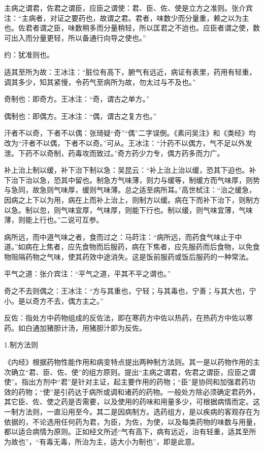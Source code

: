 \documentclass[draft,12pt]{ctexbook}
\begin{document}
\begin{jiaozhu}
  \item 主病之谓君，佐君之谓臣，应臣之谓使：君、臣、佐、使是立方之准则。张介宾注：“主病者，对证之要药也，故谓之君。君者，味数少而分量重，赖之以为主也。佐君者谓之臣，味数稍多而分量稍轻，所以匡君之不迨也。应臣者谓之使，数可出入而分量更轻，所以备通行向导之使也。”
  \item 约：犹准则也。
  \item 适其至所为故：王冰注：“脏位有高下，腑气有远近，病证有表里，药用有轻重，调其多少，知其紧慢，令药气至病所为故，勿太过与不及也。”
  \item 奇制也：即奇方。王冰注：“奇，谓古之单方。”
  \item 偶制也：即偶方。王冰注：“偶，谓古之复方也。”
  \item 汗者不以奇，下者不以偶：张琦疑“奇”“偶”二字误倒。《素问吴注》和《类经》均改为“汗者不以偶，下者不以奇。”可从。王冰注：“汁药不以偶方，气不足以外发泄。下药不以奇制，药毒攻而致过。”奇方药少力专，偶方药多而力广。
  \item 补上治上制以缓，补下治下制以急：吴昆云：“补上治上治以缓，恐其下迫也。补下治下治以急，恐其中留也。制急方气味薄，则力与缓等，制缓方而气味厚，则势与急同，故急则气味厚，缓则气味薄。总之适至病所耳。”高世栻注：“治之缓急，因病之上下以为用，病在上而补上治上，则制方以缓。病在下而补下治下，则制方以急。制以忽，则气味宜厚，气味厚，则能下行也。制以缓，则气味宜薄，气味薄，则能上行也。”二说可互参。
  \item 病所远，而中道气味之者，食而过之：马莳注：“病所远，而药食气味止于中道。”如病在上焦者，应先食物而后服药，病在下焦者，应先服药而后食物，以免食物阻隔药物之气味，使其药效中途消失。这是饭前服药或饭后服药的一种常法。
  \item 平气之道：张介宾注：“平气之道，平其不平之谓也。”
  \item 奇之不去则偶之：王冰注：“方与其重也，宁轻；与其毒也，宁善；与其大也，宁小。是以奇方不去，偶方主之。”
  \item 反佐：指处方中药物组成的反佐法，即在寒药方中佐以热药，在热药方中佐以寒药。如白通加猪胆计汤，用猪胆汁即为反佐。
\end{jiaozhu}


1.制方法则

《内经》根据药物性能作用和病变特点提出两种制方法则。其一是以药物作用的主次确立“君、臣、佐、使”的组方原则。提出“主病之谓君，佐君之谓臣，应臣之谓使”。指出方剂中“君”是针对主证，起主要作用的药物；“臣”是协同和加强君药功效的药物；“使”是引药达于病所或调和诸药的药物。一般处方除必须确定君药外，其它臣、佐、使之药是否需要，以及使用的药味和用量多少，可根据病情而定。这一制方法则，一直沿用至今。其二是因病制方。选药组方，是以疾病的客观存在为依据的，不论选用任何药为君，为臣，为佐，为使，以及每类药物的味数与用量，都以适合病情为原则。正如经文所述“气有高下，病有远近，治有轻重，适其至所为故也”，“有毒无毒，所治为主，适大小为制也”，即是此意。
\end{document}
